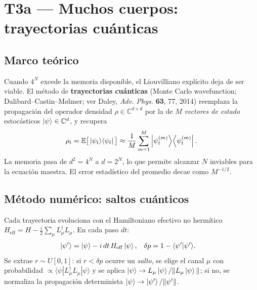\chapter{T3a --- Muchos cuerpos: trayectorias cuánticas}
\label{ch:t3a}


\section{Marco teórico}

Cuando $4^N$ excede la memoria disponible, el Liouvilliano explícito deja de ser
viable. El método de \textbf{trayectorias cuánticas} (Monte Carlo wavefunction;
Dalibard--Castin--Mølmer; ver Daley, \emph{Adv. Phys.} \textbf{63}, 77, 2014)
reemplaza la propagación del operador densidad $\rho\in\mathbb{C}^{d\times d}$ por
la de $M$ \emph{vectores de estado} estocásticos $\ket{\psi}\in\mathbb{C}^d$, y
recupera
\begin{equation}
    \rho_t = \mathbb{E}\big[\ket{\psi_t}\!\bra{\psi_t}\big]
           \approx \frac{1}{M}\sum_{m=1}^{M}\ket{\psi_t^{(m)}}\!\bra{\psi_t^{(m)}}.
\end{equation}
La memoria pasa de $d^2=4^N$ a $d=2^N$, lo que permite alcanzar $N$ inviables para
la ecuación maestra. El error estadístico del promedio decae como $M^{-1/2}$.

\section{Método numérico: saltos cuánticos}

Cada trayectoria evoluciona con el Hamiltoniano efectivo no hermítico
$H_{\mathrm{eff}} = H - \tfrac{i}{2}\sum_\mu L_\mu^\dagger L_\mu$. En cada paso $dt$:
\begin{align}
    \ket{\psi'} &= \ket{\psi} - i\,dt\,H_{\mathrm{eff}}\ket{\psi},
    & \delta p &= 1 - \langle\psi'|\psi'\rangle.
\end{align}
Se extrae $r\sim U[0,1]$: si $r<\delta p$ ocurre un \emph{salto}, se elige el canal
$\mu$ con probabilidad $\propto\langle\psi|L_\mu^\dagger L_\mu|\psi\rangle$ y se
aplica $\ket{\psi}\to L_\mu\ket{\psi}/\|L_\mu\ket{\psi}\|$; si no, se normaliza la
propagación determinista $\ket{\psi}\to\ket{\psi'}/\|\psi'\|$.


